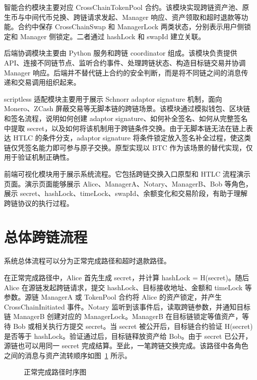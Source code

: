 智能合约模块主要对应 CrossChainTokenPool 合约。该模块实现跨链资产池、原生币与中间代币兑换、跨链请求发起、Manager 响应、资产领取和超时退款等功能。合约中保存 CrossChainSwap 和 ManagerLock 两类状态，分别表示用户侧锁定和 Manager 侧锁定。二者通过 hashLock 和 swapId 建立关联。


后端协调模块主要由 Python 服务和跨链 coordinator 组成。该模块负责提供 API、连接不同链节点、监听合约事件、处理跨链状态、构造目标链交易并协调 Manager 响应。后端并不替代链上合约的安全判断，而是将不同链之间的消息传递和交易调用组织起来。


scriptless 适配模块主要用于展示 Schnorr adaptor signature 机制，面向 Monero、ZCash 屏蔽交易等无脚本链的跨链场景。该模块通过模拟钱包、区块链和签名流程，说明如何创建 adaptor signature、如何补全签名、如何从完整签名中提取 secret，以及如何将该机制用于跨链条件交换。由于无脚本链无法在链上表达 HTLC 的条件分支，adaptor signature 将条件锁定放入签名补全过程，使这类链仅凭签名能力即可参与原子交换。原型实现以 BTC 作为该场景的替代实现，仅用于验证机制正确性。


前端可视化模块用于展示系统流程。它包括跨链交换入口原型和 HTLC 流程演示页面。演示页面能够展示 Alice、ManagerA、Notary、ManagerB、Bob 等角色，展示 secret、hashLock、timeLock、swapId、余额变化和交易阶段，有助于理解跨链协议的执行过程。


\section{总体跨链流程}


系统总体流程可以分为正常完成路径和超时退款路径。


在正常完成路径中，Alice 首先生成 secret，并计算 hashLock = H(secret)。随后 Alice 在源链发起跨链请求，提交 hashLock、目标接收地址、金额和 timeLock 等参数。源链 ManagerA 或 TokenPool 合约将 Alice 的资产锁定，并产生 CrossChainInitiated 事件。Notary 监听到该事件后，读取跨链参数，并通知目标链 ManagerB 创建对应的 ManagerLock。ManagerB 在目标链锁定等值资产，等待 Bob 或相关执行方提交 secret。当 secret 被公开后，目标链合约验证 H(secret) 是否等于 hashLock。验证通过后，目标链释放资产给 Bob。由于 secret 已公开，源链也可以用同一 secret 完成结算。至此，一笔跨链交换完成。该路径中各角色之间的消息与资产流转顺序如图~\ref{fig:crosschain_seq_complete} 所示。

\begin{figure}[htbp]
  \centering
  
  \caption{正常完成路径时序图}
  \label{fig:crosschain_seq_complete}
\end{figure}


